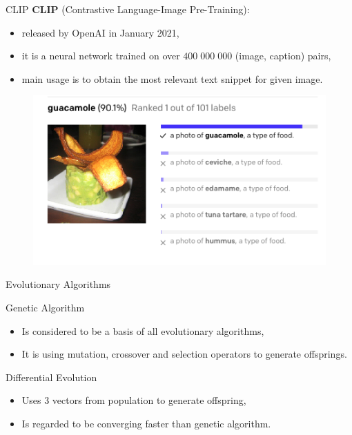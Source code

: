 \documentclass[t]{beamer}
\begin{document}
\begin{frame}{CLIP}
\textbf{CLIP} (Contrastive Language-Image Pre-Training):
\begin{itemize}
\item released by OpenAI in January 2021,
\item it is a neural network trained on over $400 \; 000 \; 000$ (image, caption) pairs,
\item main usage is to obtain the most relevant text snippet for given image.
\end{itemize}
\begin{figure}[ht!]
    \centering
    \includegraphics[scale=0.3]{clip_example.png}
\end{figure} 
\end{frame}

\begin{frame}[c]{Evolutionary Algorithms}
\begin{block}{Genetic Algorithm}
\begin{itemize}
\item Is considered to be a basis of all evolutionary algorithms,
\item It is using mutation,  crossover and selection operators to generate offsprings.
\end{itemize}
\end{block}
\begin{block}{Differential Evolution}
\begin{itemize}
\item Uses 3 vectors from population to generate offspring,
\item Is regarded to be converging faster than genetic algorithm.
\end{itemize}
\end{block}
\end{frame}
\end{document}
